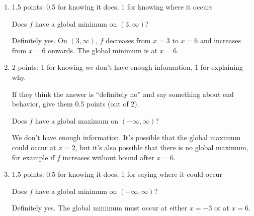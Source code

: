 \documentclass{article}
\begin{document}
\begin{enumerate}
\begin{enumerate}
  \item

    \begin{grading}
      1.5 points: 0.5 for knowing it does, 1 for knowing where it occurs
    \end{grading}

    \begin{problem}[\vfill]
      Does $f$ have a global minimum on $(3, \infty)$?
    \end{problem}

    \begin{solution}
      Definitely yes. On $(3, \infty)$, $f$ decreases from $x=3$ to $x=6$ and
      increases from $x=6$ onwards. The global minimum is at $x=6$.
    \end{solution}

  \item

    \begin{grading}
      2 points: 1 for knowing we don't have enough information, 1 for explaining why.

      If they think the answer is ``definitely no'' and say something about end behavior, give them 0.5 points (out of 2).
    \end{grading}

    \begin{problem}[\vfill]
      Does $f$ have a global maximum on $(-\infty, \infty)$?
    \end{problem}

    \begin{solution}
      We don't have enough information. It's possible that the global maximum could
      occur at $x=2$, but it's also possible that there is no global maximum, for example
      if $f$ increases without bound after $x=6$. 
    \end{solution}

  \item

    \begin{grading}
      1.5 points: 0.5 for knowing it does, 1 for saying where it could occur
    \end{grading}

    \begin{problem}[\vfill\newpage]
      Does $f$ have a global minimum on $(-\infty, \infty)$?
    \end{problem}

    \begin{solution}
      Definitely yes. The global minimum must occur at either $x=-3$ or at $x=6$. 
    \end{solution}


\end{enumerate}
\end{enumerate}
\end{document}
